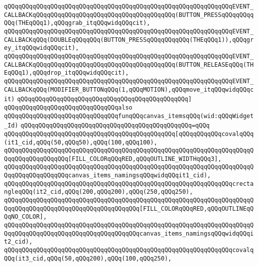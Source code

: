 \verb|qQQqqQQqqQQqqQQqqQQqqQQqqQQqqQQqqQQqqQQqqQQqqQQqqQQqqQQqqQQqqQQqEVENT_CALLBACKqQQqqQQqqQQqqQQqqQQqqQQqqQQqqQQqqQQqqQQq(BUTTON_PRESSqQQqqQQqqQQq(THEqQQq1),qQQqgrab_itqQQqwidqQQqcit),|\newline
\verb|qQQqqQQqqQQqqQQqqQQqqQQqqQQqqQQqqQQqqQQqqQQqqQQqqQQqqQQqqQQqqQQqEVENT_CALLBACKqQQq(DOUBLEqQQqqQQq(BUTTON_PRESSqQQqqQQqqQQq(THEqQQq1)),qQQqgrey_itqQQqwidqQQqcit),|\newline
\verb|qQQqqQQqqQQqqQQqqQQqqQQqqQQqqQQqqQQqqQQqqQQqqQQqqQQqqQQqqQQqqQQqEVENT_CALLBACKqQQqqQQqqQQqqQQqqQQqqQQqqQQqqQQqqQQqqQQq(BUTTON_RELEASEqQQq(THEqQQq1),qQQqdrop_itqQQqwidqQQqcit),|\newline
\verb|qQQqqQQqqQQqqQQqqQQqqQQqqQQqqQQqqQQqqQQqqQQqqQQqqQQqqQQqqQQqqQQqEVENT_CALLBACKqQQq(MODIFIER_BUTTONqQQq(1,qQQqMOTION),qQQqmove_itqQQqwidqQQqcit)|\newline
\verb|qQQqqQQqqQQqqQQqqQQqqQQqqQQqqQQqqQQqqQQqqQQqqQQq]|\newline
\newline
\verb|qQQqqQQqqQQqqQQqqQQqqQQqqQQqqQQqalso|\newline
\verb|qQQqqQQqqQQqqQQqqQQqqQQqqQQqqQQqfunqQQqcanvas_itemsqQQq(wid:qQQqWidget_Id)|\newline
\verb|qQQqqQQqqQQqqQQqqQQqqQQqqQQqqQQqqQQqqQQqqQQqqQQq=qQQq|\newline
\verb|qQQqqQQqqQQqqQQqqQQqqQQqqQQqqQQqqQQqqQQqqQQqqQQq[qQQqqQQqqQQqcovalqQQq(it1_cid,qQQq(50,qQQq50),qQQq(100,qQQq100),|\newline
\verb|qQQqqQQqqQQqqQQqqQQqqQQqqQQqqQQqqQQqqQQqqQQqqQQqqQQqqQQqqQQqqQQqqQQqqQQqqQQqqQQqqQQqqQQq[FILL_COLORqQQqRED,qQQqOUTLINE_WIDTHqQQq3],|\newline
\verb|qQQqqQQqqQQqqQQqqQQqqQQqqQQqqQQqqQQqqQQqqQQqqQQqqQQqqQQqqQQqqQQqqQQqqQQqqQQqqQQqqQQqqQQqcanvas_items_namingsqQQqwidqQQqit1_cid),|\newline
\newline
\verb|qQQqqQQqqQQqqQQqqQQqqQQqqQQqqQQqqQQqqQQqqQQqqQQqqQQqqQQqqQQqqQQqcrectangleqQQq(it2_cid,qQQq(200,qQQq200),qQQq(250,qQQq250),|\newline
\verb|qQQqqQQqqQQqqQQqqQQqqQQqqQQqqQQqqQQqqQQqqQQqqQQqqQQqqQQqqQQqqQQqqQQqqQQqqQQqqQQqqQQqqQQqqQQqqQQqqQQqqQQqqQQq[FILL_COLORqQQqRED,qQQqOUTLINEqQQqNO_COLOR],|\newline
\verb|qQQqqQQqqQQqqQQqqQQqqQQqqQQqqQQqqQQqqQQqqQQqqQQqqQQqqQQqqQQqqQQqqQQqqQQqqQQqqQQqqQQqqQQqqQQqqQQqqQQqqQQqqQQqcanvas_items_namingsqQQqwidqQQqit2_cid),|\newline
\newline
\verb|qQQqqQQqqQQqqQQqqQQqqQQqqQQqqQQqqQQqqQQqqQQqqQQqqQQqqQQqqQQqqQQqcovalqQQq(it3_cid,qQQq(50,qQQq200),qQQq(100,qQQq250),|\newline
